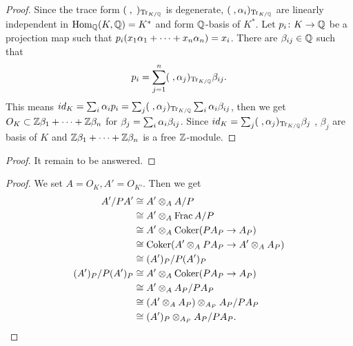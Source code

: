

\begin{proof}
  Since the trace form $(\;,\;)_{\operatorname{Tr}_{K/{\mathbb Q}}}$ is degenerate, $(\;, {\alpha}_i)_{\operatorname{Tr}_{K/{\mathbb Q}}}$ are linearly independent in $\operatorname{Hom}_{{\mathbb Q}} (K,{\mathbb Q}) = K^*$ and form ${\mathbb Q}$-basis of $K^*$. Let $p_i \colon K \to {\mathbb Q}$ be a projection map such that $p_i(x_1{\alpha}_1 + \cdots + x_n{\alpha}_n) = x_i$. There are $\beta_{ij} \in {\mathbb Q}$ such that
  \[
  p_i = \sum_{j=1}^n (\;, {\alpha}_j)_{\operatorname{Tr}_{K/{\mathbb Q}}} \beta_{ij}.
  \]
  This means $id_K = \sum_i {\alpha}_i p_i = \sum_j (\;, {\alpha}_j)_{\operatorname{Tr}_{K/{\mathbb Q}}} \sum_i {\alpha}_i \beta_{ij}$, then we get
  $O_K \subset {\mathbb Z} \beta_1 + \cdots + {\mathbb Z} \beta_n$ for $\beta_j = \sum_i {\alpha}_i \beta_{ij}$. Since $id_K  = \sum_j (\;, {\alpha}_j)_{\operatorname{Tr}_{K/{\mathbb Q}}} \beta_j$ , $\beta_j$ are basis of $K$ and ${\mathbb Z} \beta_1 + \cdots + {\mathbb Z} \beta_n$ is a free ${\mathbb Z}$-module.
\end{proof}


\begin{proof}
It remain to be answered.
\end{proof}



\begin{proof}
  We set $A = O_K, A'=O_{K'}$. Then we get
  \begin{align*}
    A'/PA' &\cong A' \otimes_A A/P \\
    &\cong A' \otimes_A \operatorname{Frac} A/P \\
    &\cong A' \otimes_A \operatorname{Coker} (PA_P \to A_P) \\
    &\cong \operatorname{Coker} (A' \otimes_A PA_P \to A' \otimes_A A_P) \\
    &\cong (A')_P / P(A')_P \\
    (A')_P / P(A')_P  &\cong A' \otimes_A \operatorname{Coker} (PA_P \to A_P) \\
    &\cong A' \otimes_A A_P / PA_P \\
    &\cong (A' \otimes_A  A_P) \otimes_{A_P} A_P / PA_P \\
    &\cong (A')_P \otimes_{A_P} A_P / PA_P.
  \end{align*}
\end{proof}



